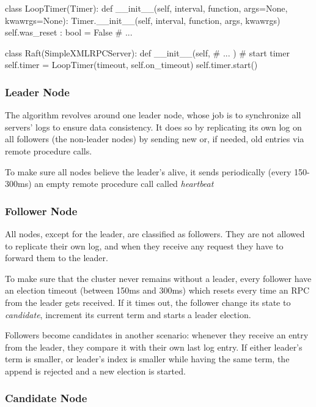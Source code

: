 \label{code:loopingTimer}
\begin{python} 
class LoopTimer(Timer):
    def __init__(self, interval, function, args=None, kwawrgs=None):
        Timer.__init__(self, interval, function, args, kwawrgs)
        self.was_reset : bool = False
    # ...

class Raft(SimpleXMLRPCServer):
    def __init__(self, 
                 # ...
                 )
        # start timer
        self.timer = LoopTimer(timeout, self.on_timeout)
        self.timer.start()
\end{python}

\subsubsection{Leader Node}

The algorithm revolves around one leader node, whose job is to synchronize all servers' logs to ensure data consistency. It does so by replicating its own log on all followers (the non-leader nodes) by sending new or, if needed, old entries via remote procedure calls. 

To make sure all nodes believe the leader's alive, it sends periodically (every 150-300ms) an empty remote procedure call called \textit{heartbeat}

\subsubsection{Follower Node}

All nodes, except for the leader, are classified as followers. They are not allowed to replicate their own log, and when they receive any request they have to forward them to the leader.

To make sure that the cluster never remains without a leader, every follower have an election timeout (between 150ms and 300ms) which resets every time an RPC from the leader gets received. If it times out, the follower change its state to \textit{candidate}, increment its current term and starts a leader election. 

Followers become candidates in another scenario: whenever they receive an entry from the leader, they compare it with their own last log entry. If either leader's term is smaller, or leader's index is smaller while having the same term, the append is rejected and a new election is started. 

\subsubsection{Candidate Node}


